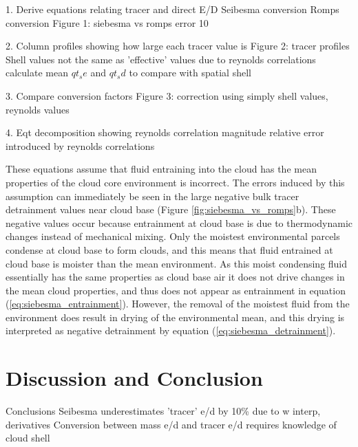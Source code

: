 \documentclass[draft,grl]{agutex}
\begin{document}
\begin{article}
1. Derive equations relating tracer and direct E/D
  Seibesma conversion
  Romps conversion
	Figure 1: siebesma vs romps error
  10%

2. Column profiles showing how large each tracer value is
    Figure 2: tracer profiles
    Shell values not the same as 'effective' values due to reynolds correlations
    calculate mean $qt_se$ and $qt_sd$ to compare with spatial shell

3. Compare conversion factors
    Figure 3: correction using simply shell values, reynolds values

4. Eqt decomposition showing reynolds correlation magnitude
    relative error introduced by reynolds correlations


These equations assume that fluid entraining into the cloud has the mean 
properties of the cloud core environment is incorrect.  The errors induced by 
this assumption can immediately be seen in the large negative bulk tracer 
detrainment values near cloud base (Figure \ref{fig:siebesma_vs_romps}b).  
These negative values occur because entrainment at cloud base is due to 
thermodynamic changes instead of mechanical mixing.  Only the moistest 
environmental parcels condense at cloud base to form clouds, and this means 
that fluid entrained at cloud base is moister than the mean environment.  As 
this moist condensing fluid essentially has the same properties as cloud base 
air it does not drive changes in the mean cloud properties, and thus does not 
appear as entrainment in equation (\ref{eq:siebesma_entrainment}).  However, the 
removal of the moistest fluid from the environment does result in drying of 
the environmental mean, and this drying is interpreted as negative 
detrainment by equation (\ref{eq:siebesma_detrainment}).



\section{Discussion and Conclusion}

Conclusions
Seibesma underestimates 'tracer' e/d by 10\% due to w interp, derivatives
Conversion between mass e/d and tracer e/d requires knowledge of cloud shell


\end{article}
\end{document}
